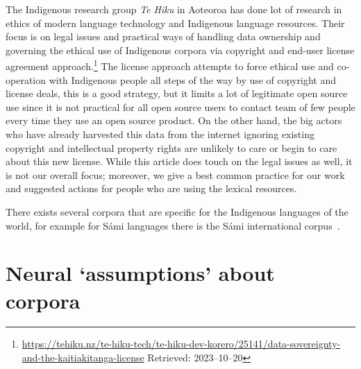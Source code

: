 \documentclass[free]{flammie}
\begin{document}
The Indigenous research group \textit{Te Hiku} in Aoteoroa has done lot of
research in ethics of modern language technology and Indigenous language
resources. Their focus is on legal issues and practical ways of handling data
ownership and governing the ethical use of Indigenous corpora via copyright and
end-user license agreement
approach.\footnote{\url{https://tehiku.nz/te-hiku-tech/te-hiku-dev-korero/25141/data-sovereignty-and-the-kaitiakitanga-license}
\smaller{} Retrieved: 2023--10--20} The license approach attempts to force ethical
use and co-operation with Indigenous people all steps of the way by use of
copyright and license deals, this is a good strategy, but it limits a lot of
legitimate open source use since it is not practical for all open source users
to contact team of few people every time they use an open source product. On the
other hand, the big actors who have already harvested this data from the
internet ignoring existing copyright and intellectual property rights are
unlikely to care or begin to care about this new license.  While this article
does touch on the legal issues as well, it is not our overall focus; moreover,
we give a best common practice for our work and suggested actions for people who
are using the lexical resources.

There exists several corpora that are specific for the Indigenous languages of
the world, for example for Sámi languages there is the Sámi international
corpus~\cite{sikor}.

\section{Neural `assumptions' about corpora}
\end{document}
